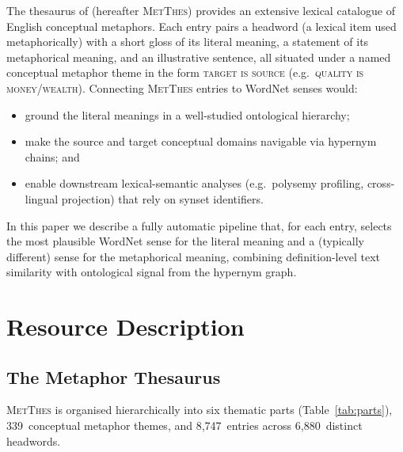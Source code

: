 \documentclass[11pt,a4paper]{article}
\begin{document}
The thesaurus of \citet{hcp78} (hereafter \textsc{MetThes}) provides an
extensive lexical catalogue of English conceptual metaphors.
Each entry pairs a headword (a lexical item used metaphorically) with a
short gloss of its literal meaning, a statement of its metaphorical
meaning, and an illustrative sentence, all situated under a named
conceptual metaphor theme in the form \textsc{target is source}
(e.g.\ \textsc{quality is money/wealth}).
Connecting \textsc{MetThes} entries to WordNet senses would:
\begin{itemize}
  \item ground the literal meanings in a well-studied ontological hierarchy;
  \item make the source and target conceptual domains navigable via
        hypernym chains; and
  \item enable downstream lexical-semantic analyses (e.g.\ polysemy
        profiling, cross-lingual projection) that rely on synset identifiers.
\end{itemize}

In this paper we describe a fully automatic pipeline that, for each entry,
selects the most plausible WordNet sense for the literal meaning and a
(typically different) sense for the metaphorical meaning, combining
definition-level text similarity with ontological signal from the
hypernym graph.

\section{Resource Description}
\label{sec:resource}

\subsection{The Metaphor Thesaurus}

\textsc{MetThes} \citep{hcp78} is organised hierarchically into six
thematic parts (Table~\ref{tab:parts}), 339~conceptual metaphor themes,
and 8,747~entries across 6,880~distinct headwords.
\end{document}
